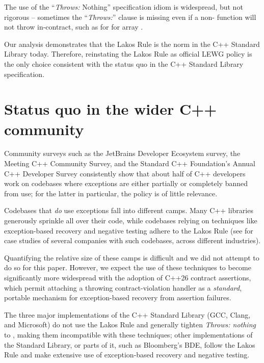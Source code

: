 The use of  the ``\emph{Throws:} Nothing'' specification idiom  is widespread, but not rigorous -- sometimes the ``\emph{Throws:}'' clause is missing even if a non- function will not throw in-contract, such as for  for array .

Our analysis demonstrates that the Lakos Rule is the norm in the C++ Standard Library today. Therefore, reinstating the Lakos Rule as official LEWG policy is the only choice consistent with the status quo in the C++ Standard Library specification.


\section{Status quo in the wider C++ community}
\label{sec:statusquo}

Community surveys such as the JetBrains Developer Ecosystem survey, the Meeting C++ Community Survey, and the Standard C++ Foundation's Annual C++ Developer Survey consistently show that about half of C++ developers work on codebases where exceptions are either partially or completely banned from use; for the latter in particular, the  policy is of little relevance.

Codebases that \emph{do} use exceptions fall into different camps. Many C++ libraries generously sprinkle  all over their code, while codebases relying on techniques like exception-based recovery and negative testing adhere to the Lakos Rule (see \cite{P2831R0} for case studies of several companies with such codebases, across different industries).

Quantifying the relative size of these camps is difficult and we did not attempt to do so for this paper. However, we expect the use of these techniques to become significantly more widespread with the adoption of C++26 contract assertions, which permit attaching a throwing contract-violation handler as a \emph{standard}, portable mechanism for exception-based recovery from assertion failures.

The three major implementations of the C++ Standard Library (GCC, Clang, and Microsoft) do not use the Lakos Rule and generally tighten \emph{Throws: nothing} to , making them incompatible with these techniques; other implementations of the Standard Library, or parts of it, such as Bloomberg's BDE, follow the Lakos Rule and make extensive use of exception-based recovery and negative testing.

